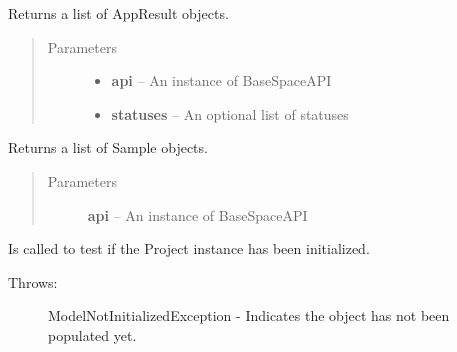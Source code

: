\documentclass[letterpaper,10pt,english]{sphinxmanual}
\begin{document}
\begin{fulllineitems}

\begin{fulllineitems}
\label{Available modules:BaseSpacePy.model.Project.Project.getAppResults}
Returns a list of AppResult objects.
\begin{quote}\begin{description}
\item[{Parameters}] \leavevmode\begin{itemize}
\item {} 
\textbf{api} -- An instance of BaseSpaceAPI

\item {} 
\textbf{statuses} -- An optional list of statuses

\end{itemize}

\end{description}\end{quote}

\end{fulllineitems}


\begin{fulllineitems}
\label{Available modules:BaseSpacePy.model.Project.Project.getSamples}
Returns a list of Sample objects.
\begin{quote}\begin{description}
\item[{Parameters}] \leavevmode
\textbf{api} -- An instance of BaseSpaceAPI

\end{description}\end{quote}

\end{fulllineitems}


\begin{fulllineitems}
\label{Available modules:BaseSpacePy.model.Project.Project.isInit}
Is called to test if the Project instance has been initialized.
\begin{description}
\item[{Throws:}] \leavevmode
ModelNotInitializedException - Indicates the object has not been populated yet.

\end{description}

\end{fulllineitems}


\end{fulllineitems}
\end{document}

